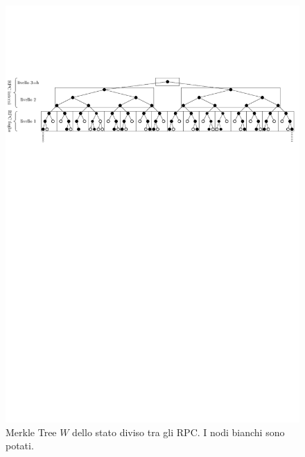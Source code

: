 \begin{figure}
	\centering
	\includegraphics[scale=0.65]{img/captre/underlying_tree.pdf}
	\caption{Merkle Tree $W$ dello stato diviso tra gli RPC. I nodi bianchi sono potati.}
	\label{fig:rpc_tree}
\end{figure}

